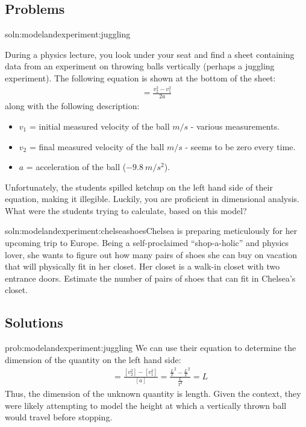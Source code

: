 \subsection{Problems}
\begin{problem}{soln:modelandexperiment:juggling}{\label{prob:modelandexperiment:juggling}During a physics lecture, you look under your seat and find a sheet containing data from an experiment on throwing balls vertically (perhaps a juggling experiment). The following equation is shown at the bottom of the sheet: 
\begin{align*}
=\frac{v_2^{2}-v_1^{2}}{2a}
\end{align*}
along with the following description: 
\begin{itemize}
\item $v_1$ = initial measured velocity of the ball $\si{m/s}$ - various measurements.
\item $v_2$ = final measured velocity of the ball $\si{m/s}$ - seems to be zero every time.
\item $a$ = acceleration of the ball ($\SI{-9.8}{m/s^2}$).
\end{itemize}
Unfortunately, the students spilled ketchup on the left hand side of their equation, making it illegible. Luckily, you are proficient in dimensional analysis. What were the students trying to calculate, based on this model?}
\end{problem}

\begin{problem}{soln:modelandexperiment:chelseashoes}{\label{prob:modelandexperiment:chelseashoes}Chelsea is preparing meticulously for her upcoming trip to Europe. Being a self-proclaimed ``shop-a-holic'' and physics lover, she wants to figure out how many pairs of shoes she can buy on vacation that will physically fit in her closet. Her closet is a walk-in closet with two entrance doors. Estimate the number of pairs of shoes that can fit in Chelsea's closet.}
\end{problem}

\subsection{Solutions}

\begin{solution}{prob:modelandexperiment:juggling}\label{soln:modelandexperiment:juggling}
We can use their equation to determine the dimension of the quantity on the left hand side:
\begin{align*}
[?]&=\frac{[v_2^{2}]-[v_1^{2}]}{[a]}=\frac{\frac{L}{T}^{2}-\frac{L}{T}^{2}}{\frac{L}{T^{2}}}= L
\end{align*}
Thus, the dimension of the unknown quantity is length. Given the context, they were likely attempting to model the height at which a vertically thrown ball would travel before stopping.\end{solution}

